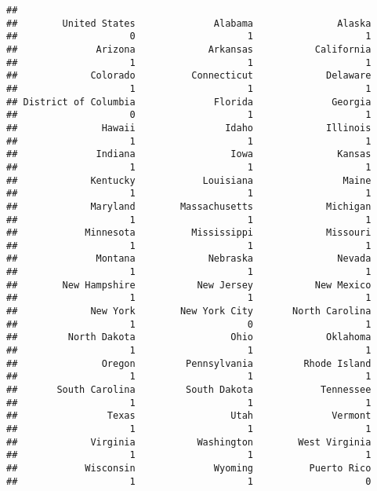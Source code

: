 \documentclass[
]{article}
\newenvironment{Shaded}{\begin{snugshade}}{\end{snugshade}}
\newcommand{\FunctionTok}[1]{\textcolor[rgb]{0.00,0.00,0.00}{#1}}
\newcommand{\NormalTok}[1]{#1}
\newcommand{\SpecialCharTok}[1]{\textcolor[rgb]{0.00,0.00,0.00}{#1}}
\begin{document}
\begin{verbatim}
## 
##        United States              Alabama               Alaska 
##                    0                    1                    1 
##              Arizona             Arkansas           California 
##                    1                    1                    1 
##             Colorado          Connecticut             Delaware 
##                    1                    1                    1 
## District of Columbia              Florida              Georgia 
##                    0                    1                    1 
##               Hawaii                Idaho             Illinois 
##                    1                    1                    1 
##              Indiana                 Iowa               Kansas 
##                    1                    1                    1 
##             Kentucky            Louisiana                Maine 
##                    1                    1                    1 
##             Maryland        Massachusetts             Michigan 
##                    1                    1                    1 
##            Minnesota          Mississippi             Missouri 
##                    1                    1                    1 
##              Montana             Nebraska               Nevada 
##                    1                    1                    1 
##        New Hampshire           New Jersey           New Mexico 
##                    1                    1                    1 
##             New York        New York City       North Carolina 
##                    1                    0                    1 
##         North Dakota                 Ohio             Oklahoma 
##                    1                    1                    1 
##               Oregon         Pennsylvania         Rhode Island 
##                    1                    1                    1 
##       South Carolina         South Dakota            Tennessee 
##                    1                    1                    1 
##                Texas                 Utah              Vermont 
##                    1                    1                    1 
##             Virginia           Washington        West Virginia 
##                    1                    1                    1 
##            Wisconsin              Wyoming          Puerto Rico 
##                    1                    1                    0
\end{verbatim}

\begin{Shaded}
\end{Shaded}
\end{document}
